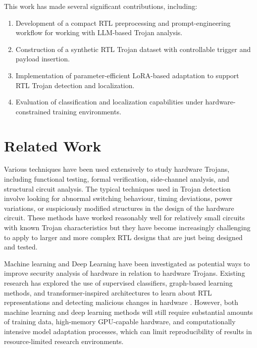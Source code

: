\documentclass[conference]{IEEEtran}
\begin{document}
This work has made several significant contributions, including:

\begin{enumerate}
    \item Development of a compact RTL preprocessing and prompt-engineering workflow for working with LLM-based Trojan analysis.
    
    \item Construction of a synthetic RTL Trojan dataset with controllable trigger and payload insertion.
    
    \item Implementation of parameter-efficient LoRA-based adaptation to support RTL Trojan detection and localization.
    
    \item Evaluation of classification and localization capabilities under hardware-constrained training environments.
\end{enumerate}


\section{Related Work}
\label{sec:related_work}

Various techniques have been used extensively to study hardware Trojans, including functional testing, formal verification, side-channel analysis, and structural circuit analysis. The typical techniques used in Trojan detection involve looking for abnormal switching behaviour, timing deviations, power variations, or suspiciously modified structures in the design of the hardware circuit. These methods have worked reasonably well for relatively small circuits with known Trojan characteristics but they have become increasingly challenging to apply to larger and more complex RTL designs that are just being designed and tested.

Machine learning and Deep Learning have been investigated as potential ways to improve security analysis of hardware in relation to hardware Trojans. Existing research has explored the use of supervised classifiers, graph-based learning methods, and transformer-inspired architectures to learn about RTL representations and detecting malicious changes in hardware \cite{hayashi2025mlht,wan2024rtl}. However, both machine learning and deep learning methods will still require substantial amounts of training data, high-memory GPU-capable hardware, and computationally intensive model adaptation processes, which can limit reproducibility of results in resource-limited research environments.
\end{document}
